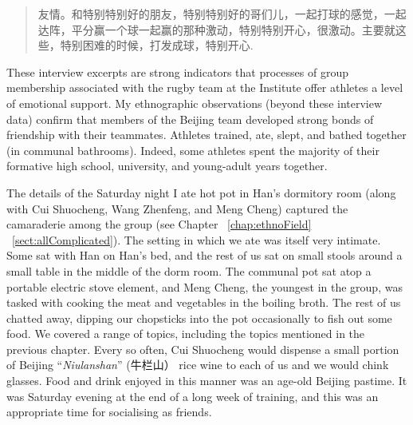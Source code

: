 \begin{CJK}{UTF8}{gbsn}
    \begin{quote}
       友情。和特别特别好的朋友，特别特别好的哥们儿，一起打球的感觉，一起达阵，平分赢一个球一起赢的那种激动，特别特别开心，很激动。主要就这些，特别困难的时候，打发成球，特别开心.
    \end{quote}

These interview excerpts are strong indicators that processes of group membership associated with the rugby team at the Institute offer athletes a level of emotional support.  My ethnographic observations (beyond these interview data) confirm that members of the Beijing team developed strong bonds of friendship with their teammates.  Athletes trained, ate, slept, and bathed together (in communal bathrooms).  Indeed, some athletes spent the majority of their formative high school, university, and young-adult years together.

The details of the Saturday night I ate hot pot in Han's dormitory room (along with Cui Shuocheng, Wang Zhenfeng, and Meng Cheng) captured the camaraderie among the group (see Chapter ~\ref{chap:ethnoField} ~\ref{sect:allComplicated}).  The setting in which we ate was itself very intimate.  Some sat with Han on Han's bed, and the rest of us sat on small stools around a small table in the middle of the dorm room.  The communal pot sat atop a portable electric stove element, and Meng Cheng, the youngest in the group, was tasked with cooking the meat and vegetables in the boiling broth.  The rest of us chatted away, dipping our chopsticks into the pot occasionally to fish out some food.  We covered a range of topics, including the topics mentioned in the previous chapter.  Every so often, Cui Shuocheng would dispense a small portion of Beijing ``\textit{Niulanshan}'' (牛栏山） rice wine to each of us and we would chink glasses.  Food and drink enjoyed in this manner was an age-old Beijing pastime. It was Saturday evening at the end of a long week of training, and this was an appropriate time for socialising as friends.


\end{CJK}

